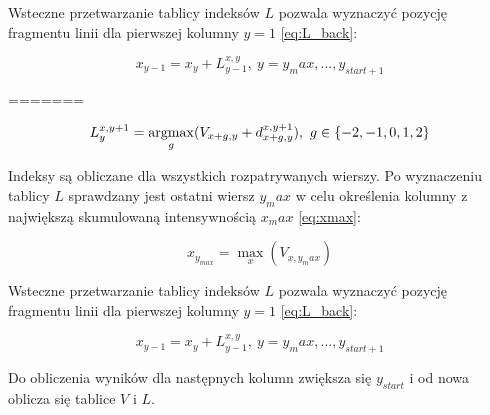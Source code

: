 \documentclass[document.tex]{subfiles}
\begin{document}
Wsteczne przetwarzanie tablicy indeksów $L$ pozwala wyznaczyć pozycję fragmentu linii dla pierwszej kolumny $y = 1$ \ref{eq:L_back}:

\begin{equation}
   x_{y-1} = x_y + L_{y-1}^{x,y},\ y = y_max,...,y_{start + 1}
    \label{eq:L_back}
\end{equation}

=======

\begin{equation}
   L_{y}^{x, y+1} = \argmax_{g}\limits(V_{x+g, y} + d_{x+g, y}^{x,y+1}),\ g\in\{-2,-1,0,1,2\}
    \label{eq:L}
\end{equation}

Indeksy są obliczane dla wszystkich rozpatrywanych wierszy. Po wyznaczeniu tablicy $L$ sprawdzany jest ostatni wiersz $y_max$ w celu określenia kolumny z największą skumulowaną intensywnością $x_max$ \ref{eq:xmax}:

\begin{equation}
   x_{y_{max}} = \max_{x}\limits(V_{x, y_max})
    \label{eq:xmax}
\end{equation}

Wsteczne przetwarzanie tablicy indeksów $L$ pozwala wyznaczyć pozycję fragmentu linii dla pierwszej kolumny $y = 1$ \ref{eq:L_back}:

\begin{equation}
   x_{y-1} = x_y + L_{y-1}^{x,y},\ y = y_max,...,y_{start + 1}
    \label{eq:L_back}
\end{equation}

Do obliczenia wyników dla następnych kolumn zwiększa się $y_{start}$ i od nowa oblicza się tablice $V$ i $L$.
\end{document}
